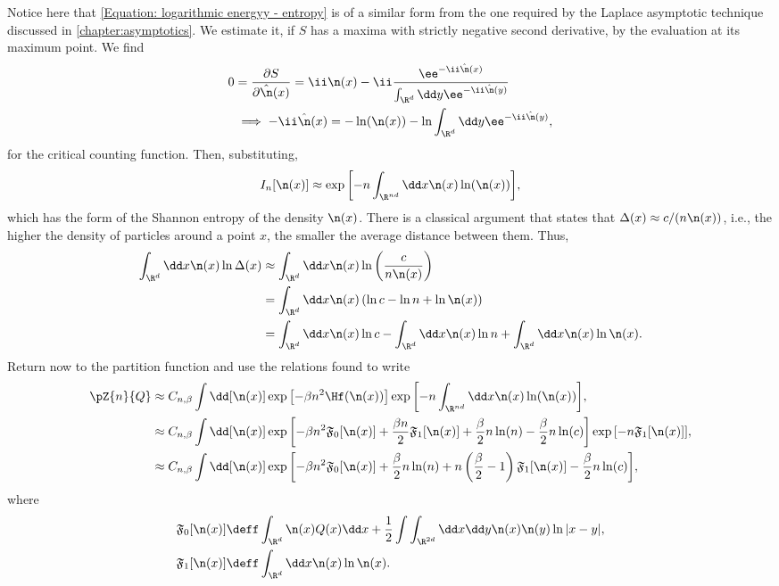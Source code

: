 Notice here that \eqref{Equation: logarithmic energyy - entropy} is of a similar form from the one required by the Laplace asymptotic technique discussed in \autoref{chapter:asymptotics}. We estimate it, if $S$ has a maxima with strictly negative second derivative, by the evaluation at its maximum point. We find
\begin{align}
	0 & = \frac{\partial S}{\partial \hat{\n}(x)} = \ii \n(x) - \ii \frac{\ee^{-\ii \hat{\n}(x)}}{\int_{\R^d} \dd y \ee^{-\ii \hat{\n}(y)}} \\
	& \implies -\ii \hat{\n}(x) = -\ln(\n(x)) - \ln \int_{\R^{d}} \dd y \ee^{-\ii \hat{\n}(y)},
\end{align}
for the critical counting function. Then, substituting,
\begin{equation}
	I_n[\n(x)] \approx \exp{\left[ -n \int_{\R^{nd}} \dd x \n(x) \ln(\n(x)) \right]},
\end{equation}
which has the form of the Shannon entropy of the density $\n(x)$. There is a classical argument that states that $\Delta(x) \approx c / (n \n(x))$, i.e., the higher the density of particles around a point $x$, the smaller the average distance between them. Thus, 
\begin{align}
	\int_{\R^d} \dd x \n(x) \ln \Delta (x) & \approx \int_{\R^d} \dd x \n(x) \ln\left( \frac{c}{n \n(x)}\right)  \\
	& = \int_{\R^d} \dd x \n(x) \left(\ln c - \ln n + \ln \n(x) \right) \\
	& = \int_{\R^d} \dd x \n(x) \ln c  - \int_{\R^d} \dd x \n(x) \ln n + \int_{\R^d} \dd x \n(x) \ln \n(x).
\end{align}
Return now to the partition function and use the relations found to write
\begin{align}
		\pZ{n}{Q} & \approx C_{n, \beta} \int \dd [\n(x)] \exp{\left[-\beta n^2 \Hf(\n(x))\right]} \exp{\left[ -n \int_{\R^{nd}} \dd x \n(x) \ln(\n(x)) \right]}, \\
		&  \approx C_{n, \beta} \int \dd [\n(x)] \exp{\left[-\beta n^2 \mathfrak{F}_0[\n(x)] + \frac{\beta n}{2} \mathfrak{F}_1[\n(x)] + \frac{\beta}{2} n \ln(n) - \frac{\beta}{2} n \ln (c) \right]} \exp{\left[ -n \mathfrak{F}_1[\n(x)] \right]}, \\
		& \approx C_{n, \beta} \int \dd [\n(x)] \exp{\left[-\beta n^2 \mathfrak{F}_0[\n(x)] + \frac{\beta}{2} n \ln(n) + n \left(\frac{\beta}{2} - 1\right) \mathfrak{F}_1[\n(x)] - \frac{\beta}{2} n \ln (c) \right]},
\end{align}
where
\begin{align}
	& \mathfrak{F}_0[\n(x)] \deff  \int_{\R^d} \n(x) Q(x) \dd x + \frac{1}{2} \int \int_{\R^{2d}} \dd x \dd y \n(x) \n(y) \ln |x - y|, \\
	& \mathfrak{F}_1[\n(x)] \deff  \int_{\R^d} \dd x \n(x) \ln \n(x).
\end{align}
